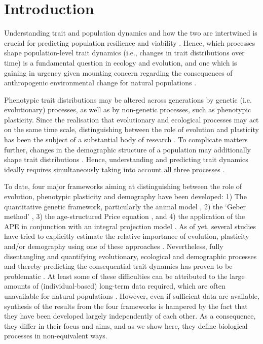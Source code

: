 \section{Introduction}


Understanding trait and population dynamics and how the two are intertwined is crucial for predicting population resilience and viability \citep[e.g.][]{merila2014}. Hence, which processes shape population-level trait dynamics (i.e., changes in trait distributions over time) is a fundamental question in ecology and evolution, and one which is gaining in urgency given mounting concern regarding the consequences of anthropogenic environmental change for natural populations \citep[e.g.][]{parmesan2006}.

Phenotypic trait distributions may be altered across generations by genetic (i.e. evolutionary) processes, as well as by non-genetic processes, such as phenotypic plasticity. Since the realisation that evolutionary and ecological processes may act on the same time scale, distinguishing between the role of evolution and plasticity has been the subject of a substantial body of research \citep{Hairston2005,Gienapp2008,Post2009}. To complicate matters further, changes in the demographic structure of a population may additionally shape trait distributions \citep{Coulson2008}. Hence, understanding and predicting trait dynamics ideally requires simultaneously taking into account all three processes \citep{Pelletier2007,Schoener2011}. 

To date, four major frameworks aiming at distinguishing between the role of evolution, phenotypic plasticity and demography have been developed: 1) The quantitative genetic framework, particularly the animal model \citep[AM; e.g.][]{Henderson1950}, 2) the `Geber method' \citep[GM;][]{Hairston2005}, 3) the age-structured Price equation \citep[APE;][]{Coulson2008}, and 4) the application of the APE in conjunction with an integral projection model \citep[IPM;][]{easterling2000,Ellner2006,Coulson2010}. As of yet, several studies have tried to explicitly estimate the relative importance of evolution, plasticity and/or demography using one of these approaches \citep[e.g.][]{reale2003, Ezard2009, Ozgul2009, Rebke2010, Becks2012, Morrissey2012b}. Nevertheless, fully disentangling and quantifying evolutionary, ecological and demographic processes and thereby predicting the consequential trait dynamics has proven to be problematic \citep{Gienapp2008,Schoener2011,merila2014}. At least some of these difficulties can be attributed to the large amounts of (individual-based) long-term data required, which are often unavailable for natural populations \citep{Clutton-brock2010}. However, even if sufficient data are available, synthesis of the results from the four frameworks is hampered by the fact that they have been developed largely independently of each other. As a consequence, they differ in their focus and aims, and as we show here, they define biological processes in non-equivalent ways.  

